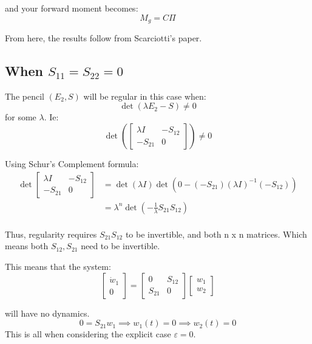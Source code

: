 \documentclass{article}
\begin{document}
and your forward moment becomes: 
\begin{equation}
    M_g = C \Pi
\end{equation}

From here, the results follow from Scarciotti's paper. 

\subsection{When \texorpdfstring{$S_{11} = S_{22} = 0$}{S11 = S22 = 0}}
The pencil $(E_2, S)$ will be regular in this case when: 
\begin{equation}
    \det( \lambda E_2 - S) \neq 0
\end{equation}
for some $\lambda$. Ie:
\begin{equation}
    \det \left(
    \begin{bmatrix}
        \lambda I & -S_{12} \\
        -S_{21} & 0
    \end{bmatrix}
    \right)
    \neq
    0
\end{equation}

Using Schur's Complement formula: 
\begin{equation}
\begin{aligned}
    \det 
    \begin{bmatrix}
        \lambda I & -S_{12} \\
        -S_{21} & 0
    \end{bmatrix}
    &= \det(\lambda I) \det(0 - (-S_{21}) (\lambda I)^{-1} (-S_{12})) \\
    &= \lambda ^ n \det( - \frac{1}{\lambda} S_{21} S_{12}) \\
\end{aligned}
\end{equation}

Thus, regularity requires $S_{21} S_{12}$ to be invertible, and both n x n matrices. 
Which means both $S_{12}, S_{21}$ need to be invertible. 

This means that the system: 
\begin{equation}
    \begin{bmatrix}
        \dot{w}_1 \\
        0
    \end{bmatrix}
    =
    \begin{bmatrix}
        0 & S_{12} \\
        S_{21} & 0
    \end{bmatrix}
    \begin{bmatrix}
        w_1 \\
        w_2
    \end{bmatrix}
\end{equation}

will have no dynamics. 
\begin{equation}
    0 = S_{21} w_1 \implies w_1(t) = 0 \implies w_2 (t) = 0
\end{equation}
This is all when considering the explicit case $\varepsilon = 0$.
\end{document}
